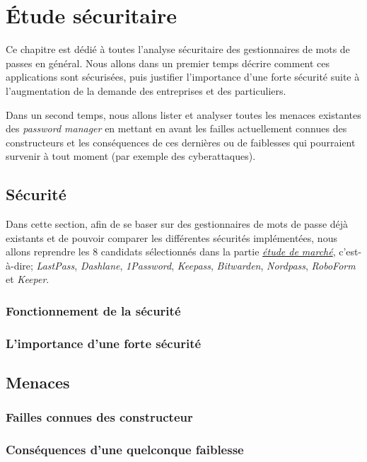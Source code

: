 

\chapter{Étude sécuritaire}
\label{ch:etude_secu}

Ce chapitre est dédié à toutes l'analyse sécuritaire des gestionnaires de mots de passes en général. Nous allons dans un premier temps décrire comment ces applications sont sécurisées, puis justifier l'importance d'une forte sécurité suite à l'augmentation de la demande des entreprises et des particuliers.

Dans un second temps, nous allons lister et analyser toutes les menaces existantes des \textit{password manager} en mettant en avant les failles actuellement connues des constructeurs et les conséquences de ces dernières ou de faiblesses qui pourraient survenir à tout moment (par exemple des cyberattaques).

\section{Sécurité}

Dans cette section, afin de se baser sur des gestionnaires de mots de passe déjà existants et de pouvoir comparer les différentes sécurités implémentées, nous allons reprendre les 8 candidats sélectionnés dans la partie \hyperref[ch:etude_marche]{\textit{étude de marché}}, c'est-à-dire; \textit{LastPass}, \textit{Dashlane}, \textit{1Password}, \textit{Keepass}, \textit{Bitwarden}, \textit{Nordpass}, \textit{RoboForm} et \textit{Keeper}.
\subsection{Fonctionnement de la sécurité}
\subsection{L'importance d'une forte sécurité}
\section{Menaces}
\subsection{Failles connues des constructeur}
\subsection{Conséquences d'une quelconque faiblesse}